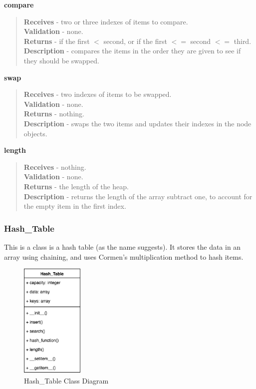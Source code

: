 \documentclass[titlepage]{article}
\begin{document}
\textbf{compare}
\begin{quote}
\textbf{Receives} - two or three indexes of items to compare. \\
\textbf{Validation} - none.\\
\textbf{Returns} - if the first $<$ second, or if the first $<=$ second $<=$ third. \\
\textbf{Description} - compares the items in the order they are given to see if they should be swapped.
\end{quote}

\textbf{swap}
\begin{quote}
\textbf{Receives} - two indexes of items to be swapped. \\
\textbf{Validation} - none.\\
\textbf{Returns} - nothing. \\
\textbf{Description} - swaps the two items and updates their indexes in the node objects.
\end{quote}

\textbf{length}
\begin{quote}
\textbf{Receives} - nothing. \\
\textbf{Validation} - none.\\
\textbf{Returns} - the length of the heap. \\
\textbf{Description} - returns the length of the array subtract one, to account for the empty item in the first index.
\end{quote}

\subsubsection{Hash\_Table}
This is a class is a hash table (as the name suggests). It stores the data in an array using chaining, and uses Cormen's multiplication method to hash items.

\begin{figure}[H]
  \centering
  \includegraphics[width=3cm]{hashcd.png}
  \caption{Hash\_Table Class Diagram}
  \label{fig:dijk}
\end{figure}
\end{document}

